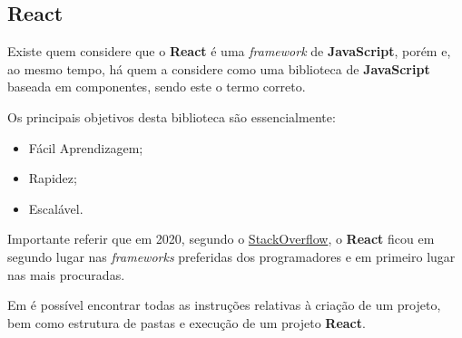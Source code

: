 \subsection{React}

\begin{minipage}[t]{.3\textwidth}
\end{minipage}
\begin{minipage}[t]{.7\textwidth}
	\minipagerestore
	Existe quem considere que o \textbf{React} é uma \textit{framework} de \textbf{JavaScript}, porém e, ao mesmo tempo, há quem a considere como uma biblioteca de \textbf{JavaScript} baseada em componentes, sendo este o termo correto.

	Os principais objetivos desta biblioteca são essencialmente:

	\begin{itemize}
		\item Fácil Aprendizagem;
		\item Rapidez;
		\item Escalável.
	\end{itemize}
\end{minipage}

\vspace{0.2cm}

Importante referir que em 2020, segundo o \href{https://insights.stackoverflow.com/survey/2020#technology-most-loved-dreaded-and-wanted-web-frameworks-loved2}{StackOverflow}, o \textbf{React} ficou em segundo lugar nas \textit{frameworks} preferidas dos programadores e em primeiro lugar nas mais procuradas.

Em  é possível encontrar todas as instruções relativas à criação de um projeto, bem como estrutura de pastas e execução de um projeto \textbf{React}.

